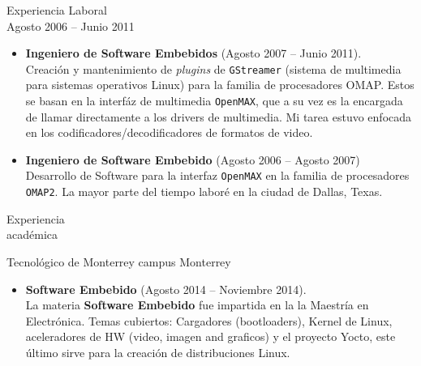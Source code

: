 \documentclass{resume}
\def\itesm{Tecnol\'ogico de Monterrey campus Monterrey}
\begin{document}
\begin{category}{Experiencia Laboral}
\\
Agosto 2006 -- Junio 2011
\begin{itemize}
\item \textbf{Ingeniero de Software Embebidos} (Agosto 2007 -- Junio 2011).\\
Creaci\'on y mantenimiento de \textit{plugins} de \texttt{GStreamer} (sistema de multimedia para sistemas operativos Linux) para la familia de procesadores OMAP. Estos se basan en la interf\'az de multimedia \texttt{OpenMAX}, que a su vez es la encargada de llamar directamente a los drivers de multimedia. Mi tarea estuvo enfocada en los codificadores/decodificadores de formatos de video.
\item \textbf{Ingeniero de Software Embebido} (Agosto 2006 -- Agosto 2007)\\
Desarrollo de Software para la interfaz \texttt{OpenMAX} en la familia de procesadores \texttt{OMAP2}. La mayor parte del tiempo labor\'e en la ciudad de Dallas, Texas.
\end{itemize}
\end{category}


\begin{category}{Experiencia \\acad\'emica}

\citem\itesm\\
\begin{itemize}
\item \textbf{Software Embebido} (Agosto 2014 -- Noviembre 2014).\\
La materia \textbf{Software Embebido} fue impartida en la la Maestr\'{i}a en Electr\'onica. Temas cubiertos: Cargadores (bootloaders), Kernel de Linux, 
aceleradores de HW (video, imagen and graficos) y el proyecto Yocto, este \'ultimo sirve para la creaci\'on de distribuciones Linux.
\end{itemize}
\end{category}
\end{document}
